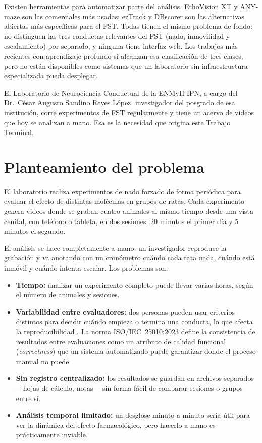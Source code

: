 Existen herramientas para automatizar parte del análisis. EthoVision XT
\cite{noldus_ethovision} y ANY-maze son las comerciales más usadas; ezTrack
\cite{pennington2019_eztrack} y DBscorer \cite{nandi2021_dbscorer} son las alternativas
abiertas más específicas para el FST. Todas tienen el mismo problema de fondo: no
distinguen las tres conductas relevantes del FST (nado, inmovilidad y escalamiento) por
separado, y ninguna tiene interfaz web. Los trabajos más recientes con aprendizaje
profundo \cite{della_valle2025,meng2024_dsaan} sí alcanzan esa clasificación de tres
clases, pero no están disponibles como sistemas que un laboratorio sin infraestructura
especializada pueda desplegar.

El Laboratorio de Neurociencia Conductual de la ENMyH-IPN, a cargo del Dr.\ César
Augusto Sandino Reyes López, investigador del posgrado de esa institución, corre
experimentos de FST regularmente y tiene un acervo de videos que
hoy se analizan a mano. Esa es la necesidad que origina este Trabajo Terminal.

\section{Planteamiento del problema}

El laboratorio realiza experimentos de nado forzado de forma periódica para evaluar el
efecto de distintas moléculas en grupos de ratas. Cada experimento genera videos donde
se graban cuatro animales al mismo tiempo desde una vista cenital, con teléfono o
tableta, en dos sesiones: 20 minutos el primer día y 5 minutos el segundo.

El análisis se hace completamente a mano: un investigador reproduce la grabación y va
anotando con un cronómetro cuándo cada rata nada, cuándo está inmóvil y cuándo intenta
escalar. Los problemas son:

\begin{itemize}
  \item \textbf{Tiempo:} analizar un experimento completo puede llevar varias horas,
        según el número de animales y sesiones.
  \item \textbf{Variabilidad entre evaluadores:} dos personas pueden usar criterios
        distintos para decidir cuándo empieza o termina una conducta, lo que afecta la
        reproducibilidad \cite{armario2021}. La norma ISO/IEC~25010:2023 \cite{iso25010}
        define la consistencia de resultados entre evaluaciones como un atributo de
        calidad funcional (\textit{correctness}) que un sistema automatizado puede
        garantizar donde el proceso manual no puede.
  \item \textbf{Sin registro centralizado:} los resultados se guardan en archivos
        separados ---hojas de cálculo, notas--- sin forma fácil de comparar sesiones o
        grupos entre sí.
  \item \textbf{Análisis temporal limitado:} un desglose minuto a minuto sería útil
        para ver la dinámica del efecto farmacológico, pero hacerlo a mano es
        prácticamente inviable.
\end{itemize}

